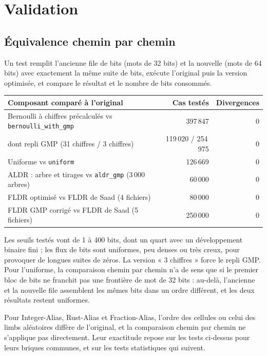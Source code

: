 \documentclass[11pt,a4paper]{article}
\newcommand{\code}[1]{\texttt{#1}}
\begin{document}
\section{Validation}

\subsection{Équivalence chemin par chemin}

Un test remplit l'ancienne file de bits (mots de 32 bits) et la nouvelle (mots de
64 bits) avec exactement la même suite de bits, exécute l'original puis la version
optimisée, et compare le résultat et le nombre de bits consommés.

\begin{table}[H]
\centering
\small
\begin{tabular}{lrr}
\toprule
Composant comparé à l'original & Cas testés & Divergences \\
\midrule
Bernoulli à chiffres précalculés vs \code{bernoulli\_with\_gmp} & 397\,847 & 0 \\
\quad dont repli GMP (31 chiffres / 3 chiffres) & 119\,020 / 254\,975 & 0 \\
Uniforme vs \code{uniform} & 126\,669 & 0 \\
ALDR : arbre et tirages vs \code{aldr\_gmp} (3\,000 arbres) & 60\,000 & 0 \\
FLDR optimisé vs FLDR de Saad (4 fichiers) & 80\,000 & 0 \\
FLDR GMP corrigé vs FLDR de Saad (5 fichiers) & 250\,000 & 0 \\
\bottomrule
\end{tabular}
\end{table}

\noindent Les seuils testés vont de 1 à 400 bits, dont un quart avec un développement
binaire fini ; les flux de bits sont uniformes, peu denses ou très creux, pour
provoquer de longues suites de zéros. La version « 3 chiffres » force le repli GMP.
Pour l'uniforme, la comparaison chemin par chemin n'a de sens que si le premier bloc
de bits ne franchit pas une frontière de mot de 32 bits : au-delà, l'ancienne et la
nouvelle file assemblent les mêmes bits dans un ordre différent, et les deux résultats
restent uniformes.

Pour Integer-Alias, Rust-Alias et Fraction-Alias, l'ordre des cellules ou celui des
limbs aléatoires diffère de l'original, et la comparaison chemin par chemin ne
s'applique pas directement. Leur exactitude repose sur les tests ci-dessus pour leurs
briques communes, et sur les tests statistiques qui suivent.
\end{document}
